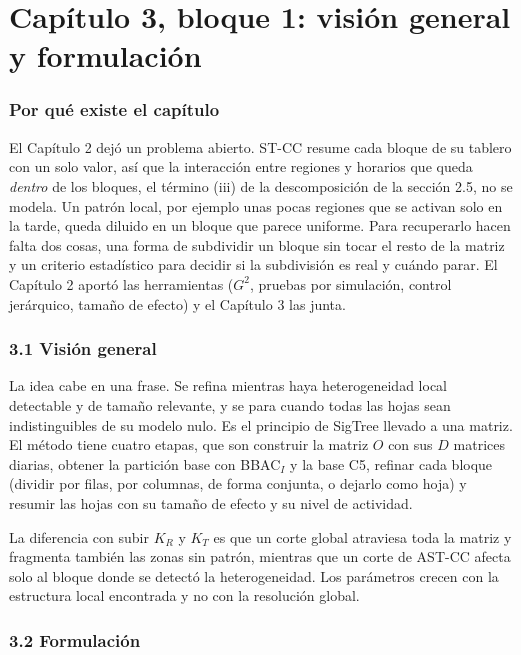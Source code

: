\documentclass[11pt,a4paper]{article}
\begin{document}
\part{Capítulo 3, bloque 1: visión general y formulación}

\section{Por qué existe el capítulo}

El Capítulo 2 dejó un problema abierto. ST-CC resume cada bloque de su tablero con
un solo valor, así que la interacción entre regiones y horarios que queda
\emph{dentro} de los bloques, el término (iii) de la descomposición de la
sección 2.5, no se modela. Un patrón local, por ejemplo unas pocas regiones que se
activan solo en la tarde, queda diluido en un bloque que parece uniforme. Para
recuperarlo hacen falta dos cosas, una forma de subdividir un bloque sin tocar el
resto de la matriz y un criterio estadístico para decidir si la subdivisión es
real y cuándo parar. El Capítulo 2 aportó las herramientas ($G^2$, pruebas por
simulación, control jerárquico, tamaño de efecto) y el Capítulo 3 las junta.

\section{3.1 Visión general}

La idea cabe en una frase. Se refina mientras haya heterogeneidad local detectable
y de tamaño relevante, y se para cuando todas las hojas sean indistinguibles de su
modelo nulo. Es el principio de SigTree llevado a una matriz. El método tiene
cuatro etapas, que son construir la matriz $O$ con sus $D$ matrices diarias,
obtener la partición base con BBAC$_I$ y la base C5, refinar cada bloque
(dividir por filas, por columnas, de forma conjunta, o dejarlo como hoja) y
resumir las hojas con su tamaño de efecto y su nivel de actividad.

La diferencia con subir $K_R$ y $K_T$ es que un corte global atraviesa toda la
matriz y fragmenta también las zonas sin patrón, mientras que un corte de AST-CC
afecta solo al bloque donde se detectó la heterogeneidad. Los parámetros crecen
con la estructura local encontrada y no con la resolución global.

\section{3.2 Formulación}
\end{document}
